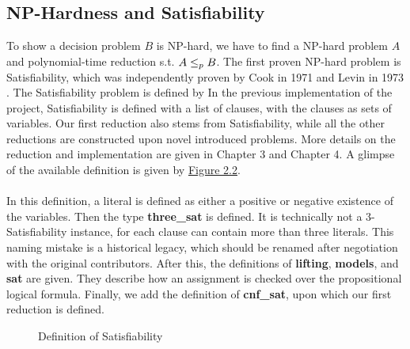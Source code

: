 \subsection*{NP-Hardness and Satisfiability}
To show a decision problem $B$ is NP-hard, 
we have to find a NP-hard problem $A$ and polynomial-time reduction 
s.t. $A \leq_p B$. The first proven NP-hard problem is Satisfiability, 
which was independently proven by Cook in 1971 \cite{cook2023complexity} and Levin in 1973 \cite{levin1973universal}. 
The Satisfiability problem is defined by 
In the previous implementation of the project, Satisfiability is defined with a list of clauses, with the clauses as sets of variables.
Our first reduction also stems from Satisfiability, while all the other reductions are constructed upon novel introduced problems. 
More details on the reduction and implementation are given in Chapter 3 and Chapter 4. A glimpse of the available 
definition is given by \hyperref[figure:2]{Figure 2.2}. \\\\
In this definition, a literal is defined as either a positive or negative existence of the variables. Then 
the type \textbf{three\_sat} is defined. It is technically not a 3-Satisfiability instance, for each clause can 
contain more than three literals. This naming mistake is a historical legacy, which should be renamed after negotiation with the original contributors.
After this, the definitions of \textbf{lifting}, \textbf{models}, and \textbf{sat} are given. They describe how an assignment is checked over the propositional 
logical formula. Finally, we add the definition of \textbf{cnf\_sat}, upon which our first reduction is defined.
\begin{figure}[!h]
    \caption{Definition of Satisfiability}
    \label{figure:2}
\end{figure}

